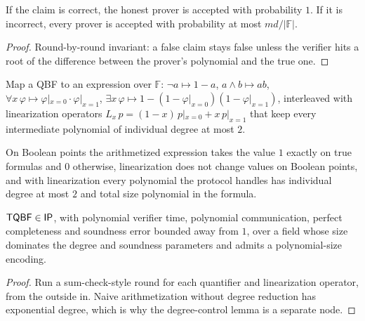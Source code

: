 \begin{theorem}
  \label{thm:interaction-sumcheck}
  \notready
  If the claim is correct, the honest prover is accepted with probability $1$.
  If it is incorrect, every prover is accepted with probability at most
  $m d / |\mathbb{F}|$.
\end{theorem}
\begin{proof}
  Round-by-round invariant: a false claim stays false unless the verifier hits
  a root of the difference between the prover's polynomial and the true one.
\end{proof}

\begin{definition}
  \label{def:interaction-arithmetization}
  Map a QBF to an expression over $\mathbb{F}$: $\neg a \mapsto 1 - a$,
  $a \wedge b \mapsto ab$, $\forall x\, \varphi \mapsto \varphi|_{x=0} \cdot
  \varphi|_{x=1}$, $\exists x\, \varphi \mapsto 1 - (1 - \varphi|_{x=0})(1 -
  \varphi|_{x=1})$, interleaved with linearization operators
  $L_{x}\, p = (1 - x)\, p|_{x=0} + x\, p|_{x=1}$ that keep every intermediate
  polynomial of individual degree at most $2$.
\end{definition}

\begin{lemma}
  \label{lem:interaction-degree-reduction}
  \notready
  On Boolean points the arithmetized expression takes the value $1$ exactly on
  true formulas and $0$ otherwise, linearization does not change values on
  Boolean points, and with linearization every polynomial the protocol handles
  has individual degree at most $2$ and total size polynomial in the formula.
\end{lemma}

\begin{theorem}
  \label{thm:interaction-tqbf-protocol}
  \notready
  $\mathsf{TQBF} \in \mathsf{IP}$, with polynomial verifier time, polynomial
  communication, perfect completeness and soundness error bounded away from
  $1$, over a field whose size dominates the degree and soundness parameters
  and admits a polynomial-size encoding.
\end{theorem}
\begin{proof}
  Run a sum-check-style round for each quantifier and linearization operator,
  from the outside in. Naive arithmetization without degree reduction has
  exponential degree, which is why the degree-control lemma is a separate
  node.
\end{proof}

